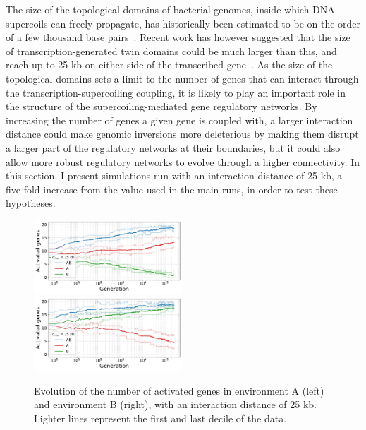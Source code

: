 The size of the topological domains of bacterial genomes, inside which DNA supercoils can freely propagate, has historically been estimated to be on the order of a few thousand base pairs~\citep{elhanafi2000,postow2004,kouzine2013}.
Recent work has however suggested that the size of transcription-generated twin domains could be much larger than this, and reach up to 25 kb on either side of the transcribed gene~\citep{visser2022}.
As the size of the topological domains sets a limit to the number of genes that can interact through the transcription-supercoiling coupling, it is likely to play an important role in the structure of the supercoiling-mediated gene regulatory networks.
By increasing the number of genes a given gene is coupled with, a larger interaction distance could make genomic inversions more deleterious by making them disrupt a larger part of the regulatory networks at their boundaries, but it could also allow more robust regulatory networks to evolve through a higher connectivity.
In this section, I present simulations run with an interaction distance of 25 kb, a five-fold increase from the value used in the main runs, in order to test these hypotheses.

\begin{figure}[H]
\centering
\includegraphics[width=0.495\textwidth]{param/interaction-25k/gene_activity_env_A.pdf}
\includegraphics[width=0.495\textwidth]{param/interaction-25k/gene_activity_env_B.pdf}
\caption[Evolution of the number of activated genes in each environment, with an interaction distance of 25 kb]{Evolution of the number of activated genes in environment A (left) and environment B (right), with an interaction distance of 25 kb.
Lighter lines represent the first and last decile of the data.}
\label{fig:param:inter25k-activ-by-env}
\end{figure}

